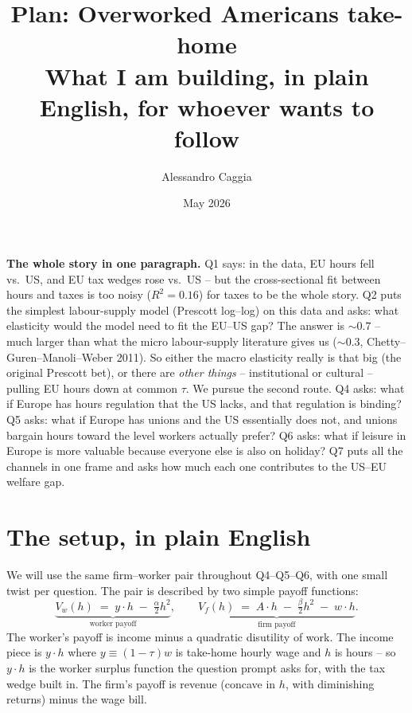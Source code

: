 \documentclass[11pt,a4paper]{article}
\title{\vspace{-2em}\textbf{Plan: Overworked Americans take-home}\\[0.2em]
\large What I am building, in plain English, for whoever wants to follow}
\author{Alessandro Caggia}
\date{May 2026}
\begin{document}
\maketitle
\vspace{-2em}

\begin{tldr}
\textbf{The whole story in one paragraph.} Q1 says: in the data, EU
hours fell vs.\ US, and EU tax wedges rose vs.\ US -- but the
cross-sectional fit between hours and taxes is too noisy
($R^2\!=\!0.16$) for taxes to be the whole story. Q2 puts the simplest
labour-supply model (Prescott log--log) on this data and asks: what
elasticity would the model need to fit the EU--US gap? The answer is
$\sim\!0.7$ -- much larger than what the micro labour-supply
literature gives us ($\sim\!0.3$, Chetty--Guren--Manoli--Weber 2011).
So either the macro elasticity really is that big (the original
Prescott bet), or there are \emph{other things} -- institutional or
cultural -- pulling EU hours down at common $\tau$. We pursue the
second route. Q4 asks: what if Europe has hours regulation that the
US lacks, and that regulation is binding? Q5 asks: what if Europe has
unions and the US essentially does not, and unions bargain hours
toward the level workers actually prefer? Q6 asks: what if leisure in
Europe is more valuable because everyone else is also on holiday?
Q7 puts all the channels in one frame and asks how much each one
contributes to the US--EU welfare gap.
\end{tldr}

\section{The setup, in plain English}

We will use the same firm--worker pair throughout Q4--Q5--Q6, with one
small twist per question. The pair is described by two simple payoff
functions:
\[
\underbrace{V_w(h)\;=\;y\cdot h\;-\;\tfrac{\alpha}{2}h^2}_{\text{worker payoff}},
\qquad
\underbrace{V_f(h)\;=\;A\cdot h\;-\;\tfrac{\beta}{2}h^2\;-\;w\cdot h}_{\text{firm payoff}}.
\]
The worker's payoff is income minus a quadratic disutility of work.
The income piece is $y\cdot h$ where $y\!\equiv\!(1-\tau)w$ is take-home
hourly wage and $h$ is hours -- so $y\cdot h$ is the worker surplus
function the question prompt asks for, with the tax wedge built in.
The firm's payoff is revenue (concave in $h$, with diminishing returns)
minus the wage bill.
\end{document}
